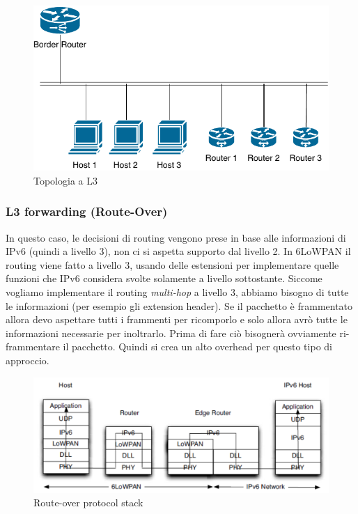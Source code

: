 \documentclass{article}
\begin{document}
\begin{figure}[H]
\centering
\includegraphics[scale=0.4]{figures/topologia L3.pdf}
\caption{Topologia a L3}
\end{figure}

\subsubsection{L3 forwarding (Route-Over)}
In questo caso, le decisioni di routing vengono prese in base alle informazioni di IPv6 (quindi a livello 3), non ci si aspetta supporto dal livello 2. In 6LoWPAN il routing viene fatto a livello 3, usando delle estensioni per implementare quelle funzioni che IPv6 considera svolte solamente a livello sottostante. Siccome vogliamo implementare il routing \textit{multi-hop} a livello 3, abbiamo bisogno di tutte le informazioni (per esempio gli extension header). Se il pacchetto è frammentato allora devo aspettare tutti i frammenti per ricomporlo e solo allora avrò tutte le informazioni necessarie per inoltrarlo. Prima di fare ciò bisognerà ovviamente ri-frammentare il pacchetto. Quindi si crea un alto overhead per questo tipo di approccio.
\begin{figure}[H]
\centering
\includegraphics[scale=0.4]{figures/L3 forwarding.png}
\caption{Route-over protocol stack}
\end{figure}
\end{document}
